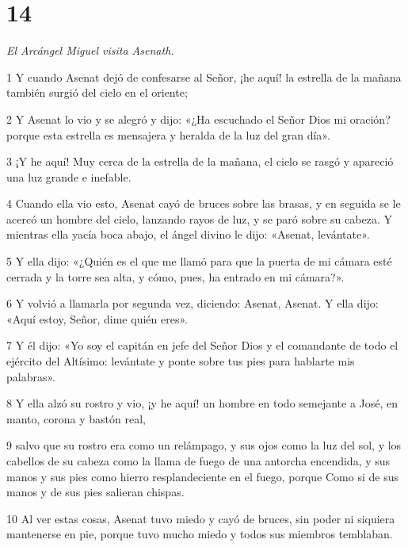 \chapter{14}

\par \textit{El Arcángel Miguel visita Asenath.}

\par 1 Y cuando Asenat dejó de confesarse al Señor, ¡he aquí! la estrella de la mañana también surgió del cielo en el oriente;

\par 2 Y Asenat lo vio y se alegró y dijo: «¿Ha escuchado el Señor Dios mi oración? porque esta estrella es mensajera y heralda de la luz del gran día».

\par 3 ¡Y he aquí! Muy cerca de la estrella de la mañana, el cielo se rasgó y apareció una luz grande e inefable.

\par 4 Cuando ella vio esto, Asenat cayó de bruces sobre las brasas, y en seguida se le acercó un hombre del cielo, lanzando rayos de luz, y se paró sobre su cabeza. Y mientras ella yacía boca abajo, el ángel divino le dijo: «Asenat, levántate».

\par 5 Y ella dijo: «¿Quién es el que me llamó para que la puerta de mi cámara esté cerrada y la torre sea alta, y cómo, pues, ha entrado en mi cámara?».

\par 6 Y volvió a llamarla por segunda vez, diciendo: Asenat, Asenat. Y ella dijo: «Aquí estoy, Señor, dime quién eres».

\par 7 Y él dijo: «Yo soy el capitán en jefe del Señor Dios y el comandante de todo el ejército del Altísimo: levántate y ponte sobre tus pies para hablarte mis palabras».

\par 8 Y ella alzó su rostro y vio, ¡y he aquí! un hombre en todo semejante a José, en manto, corona y bastón real,

\par 9 salvo que su rostro era como un relámpago, y sus ojos como la luz del sol, y los cabellos de su cabeza como la llama de fuego de una antorcha encendida, y sus manos y sus pies como hierro resplandeciente en el fuego, porque Como si de sus manos y de sus pies salieran chispas.

\par 10 Al ver estas cosas, Asenat tuvo miedo y cayó de bruces, sin poder ni siquiera mantenerse en pie, porque tuvo mucho miedo y todos sus miembros temblaban.

